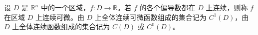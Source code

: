 \begin{remark}
  设 $D$ 是 $\mathbb{R}^n$ 中的一个区域，$f: D \to \mathbb{R}$。若 $f$ 的各个偏导数都在 $D$ 上连续，则称 $f$ 在区域 $D$ 上连续可微。由 $D$ 上全体连续可微函数组成的集合记为 $C^{1}(D)$，由 $D$ 上全体连续函数组成的集合记为 $C(D)$ 或 $C^{0}(D)$。
\end{remark}



\section{}







\section{}







\section{}







\section{}







\section{}







\section{}







\section{}






